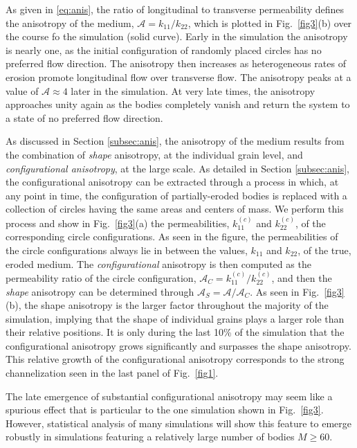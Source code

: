 \documentclass[3p]{elsarticle}
\newcommand{\anis}{\mathcal{A}}
\begin{document}
As given in \eqref{eq:anis}, the ratio of longitudinal to transverse permeability defines the anisotropy of the medium, $\anis = k_{11} / k_{22}$, which is plotted in Fig.~\ref{fig3}(b) over the course fo the simulation (solid curve). Early in the simulation the anisotropy is nearly one, as the initial configuration of randomly placed circles has no preferred flow direction. The anisotropy then increases as heterogeneous rates of erosion promote longitudinal flow over transverse flow. The anisotropy peaks at a value of $\anis \approx 4$ later in the simulation. At very late times, the anisotropy approaches unity again as the bodies completely vanish and return the system to a state of no preferred flow direction.

As discussed in Section \ref{subsec:anis}, the anisotropy of the medium results from the combination of {\em shape} anisotropy, at the individual grain level, and {\em configurational anisotropy}, at the large scale. As detailed in Section \ref{subsec:anis}, the configurational anisotropy can be extracted through a process in which, at any point in time, the configuration of partially-eroded bodies is replaced with a collection of circles having the same areas and centers of mass. We perform this process and show in Fig.~\ref{fig3}(a) the permeabilities, $k_{11}^{(c)}$ and $k_{22}^{(c)}$, of the corresponding circle configurations. As seen in the figure, the permeabilities of the circle configurations always lie in between the values, $k_{11}$ and $k_{22}$, of the true, eroded medium. The {\em configurational} anisotropy is then computed as the permeability ratio of the circle configuration, $\anis_C = k_{11}^{(c)} / k_{22}^{(c)}$, and then the {\em shape} anisotropy can be determined through $\anis_S = \anis/\anis_C$. As seen in Fig.~\ref{fig3}(b), the shape anisotropy is the larger factor throughout the majority of the simulation, implying that the shape of individual grains plays a larger role than their relative positions. It is only during the last 10\% of the simulation that the configurational anisotropy grows significantly and surpasses the shape anisotropy. This relative growth of the configurational anisotropy corresponds to the strong channelization seen in the last panel of Fig.~\ref{fig1}.

The late emergence of substantial configurational anisotropy may seem like a spurious effect that is particular to the one simulation shown in Fig.~\ref{fig3}. However, statistical analysis of many simulations will show this feature to emerge robustly in simulations featuring a relatively large number of bodies $M \ge 60$.
\end{document}
